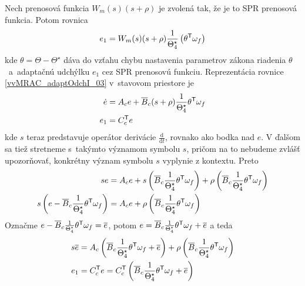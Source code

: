 ﻿\documentclass[a4paper, 10pt, ]{article}
\begin{document}
Nech prenosová funkcia $W_m(s) (s+\rho)$ je zvolená tak, že je to SPR prenosová funkcia. Potom rovnica
\begin{equation}  \label{vvMRAC_adaptOdchI_03}
	e_1 = W_m(s) (s+\rho) \frac{1}{\Theta_4^\star} \left( {\theta}^{\mathsf{T}} \omega_f \right)
\end{equation}
kde $\theta = \Theta - \Theta^\star$ dáva do vzťahu chybu nastavenia parametrov zákona riadenia $\theta$~a~adaptačnú udchýlku $e_1$ cez SPR prenosovú funkciu. Reprezentácia rovnice \eqref{vvMRAC_adaptOdchI_03} v~stavovom priestore je
\begin{subequations} \label{vvMRAC_adaptOdchISS}
	\begin{align}
		\dot{e} &= A_c e + \overline{B}_c (s+\rho) \frac{1}{\Theta_4^\star} \theta^{\mathsf{T}} \omega_f \\
		e_1 &= C_c^{\mathsf{T}} e
	\end{align}
\end{subequations}
kde $s$ teraz predstavuje operátor derivácie $\frac{\text{d}}{\text{d}t}$, rovnako ako bodka \uv{$\,\dot{}\,$} nad $e$. V ďalšom sa tiež stretneme s~takýmto významom symbolu $s$, pričom na to nebudeme zvlášť upozorňovať, konkrétny význam symbolu $s$ vyplynie z kontextu. Preto
\begin{subequations}
	\begin{align}
		se &= A_c e + s \left( \overline{B}_c \frac{1}{\Theta_4^\star} \theta^{\mathsf{T}} \omega_f \right) + \rho \left( \overline{B}_c \frac{1}{\Theta_4^\star} \theta^{\mathsf{T}} \omega_f \right) \\
		s \left( e - \overline{B}_c \frac{1}{\Theta_4^\star} \theta^{\mathsf{T}} \omega_f \right) &= A_c e + \rho \left( \overline{B}_c \frac{1}{\Theta_4^\star} \theta^{\mathsf{T}} \omega_f \right)
		\end{align}
\end{subequations}
Označme $e - \overline{B}_c \frac{1}{\Theta_4^\star} \theta^{\mathsf{T}} \omega_f = \overline{e} $, potom $e = \overline{B}_c \frac{1}{\Theta_4^\star} \theta^{\mathsf{T}} \omega_f + \overline{e} $ a teda
\begin{subequations}
	\begin{align}
		s \overline{e} &= A_c \left( \overline{B}_c \frac{1}{\Theta_4^\star} \theta^{\mathsf{T}} \omega_f + \overline{e} \right) + \rho \left( \overline{B}_c \frac{1}{\Theta_4^\star} \theta^{\mathsf{T}} \omega_f \right) \\
		e_1 &= C_c^{\mathsf{T}} e = C_c^{\mathsf{T}} \left( \overline{B}_c \frac{1}{\Theta_4^\star} \theta^{\mathsf{T}} \omega_f + \overline{e} \right)
	\end{align}
\end{subequations}
\end{document}

